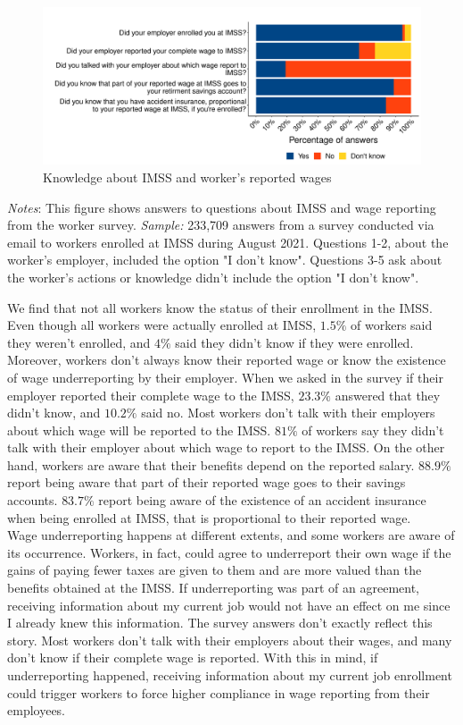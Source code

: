 \documentclass[10pt, oneside]{book}
\begin{document}
\begin{figure}[H]
    \centering
    \caption{Knowledge about IMSS and worker's reported wages \label{fig:hist_knowledge_register_survey}}
    \includegraphics[width=\textwidth]{04_Figures/worker_survey/hist_knowledge_register_survey.pdf}
\end{figure}
\scriptsize{\textit{Notes}: This figure shows answers to questions about IMSS and wage reporting from the worker survey. \textit{Sample:} 233,709 answers from a survey conducted via email to workers enrolled at IMSS during August 2021. Questions 1-2, about the worker's employer, included the option "I don't know". Questions 3-5 ask about the worker's actions or knowledge didn't include the option "I don't know".
} \\

\normalsize

We find that not all workers know the status of their enrollment in the IMSS. Even though all workers were actually enrolled at IMSS, $1.5\%$ of workers said they weren't enrolled, and $4\%$ said they didn't know if they were enrolled. Moreover, workers don't always know their reported wage or know the existence of wage underreporting by their employer. When we asked in the survey if their employer reported their complete wage to the IMSS, $23.3\%$ answered that they didn't know, and $10.2\%$ said no. Most workers don't talk with their employers about which wage will be reported to the IMSS. $81\%$ of workers say they didn't talk with their employer about which wage to report to the IMSS. On the other hand, workers are aware that their benefits depend on the reported salary. $88.9\%$ report being aware that part of their reported wage goes to their savings accounts. $83.7\%$ report being aware of the existence of an accident insurance when being enrolled at IMSS, that is proportional to their reported wage. \\

Wage underreporting happens at different extents, and some workers are aware of its occurrence. Workers, in fact, could agree to underreport their own wage if the gains of paying fewer taxes are given to them and are more valued than the benefits obtained at the IMSS. If underreporting was part of an agreement, receiving information about my current job would not have an effect on me since I already knew this information. The survey answers don't exactly reflect this story. Most workers don't talk with their employers about their wages, and many don't know if their complete wage is reported. With this in mind, if underreporting happened, receiving information about my current job enrollment could trigger workers to force higher compliance in wage reporting from their employees.
\end{document}
